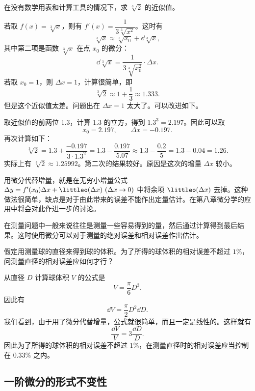 \begin{xexample}[6.3.1]
在没有数学用表和计算工具的情况下，求 $\sqrt[3]{2}$ 的近似值。
\end{xexample}
\begin{xsolution}
若取 $f(x)=\sqrt[3]{x}$，则有 $f'(x)=\dfrac1{3\sqrt[3]{x^2}}$。这时有
\[
  \sqrt[3]{x}\approx\sqrt[3]{x_0}+\dd\sqrt[3]{x},
\]
其中第二项是函数 $\sqrt[3]{x}$ 在点 $x_0$ 的微分：
\[
  \dd\sqrt[3]{x}=\frac1{3\sqrt[3]{x_0^2}}\cdot\Delta x.
\]
若取 $x_0=1$，则 $\Delta x=1$，计算很简单，即
\[
  \sqrt[3]{2}\approx1+\frac13\approx1.333.
\]
但是这个近似值太差。问题出在 $\Delta x=1$ 太大了。可以改进如下。

取近似值的前两位 1.3，计算 1.3 的立方，得到 $1.3^3=2.197$。因此可以取
\[
  x_0=2.197,\qquad\Delta x=-0.197.
\]
再次计算如下：
\[
  \sqrt[3]{2}
  =1.3+\frac{-0.197}{3\cdot1.3^2}
  =1.3-\frac{0.197}{5.07}
  \approx1.3-\frac{0.2}{5}
  =1.3-0.04=1.26.
\]
实际上有 $\sqrt[3]{2}\approx1.25992$。第二次的结果较好。原因是这次的增量 $\Delta x$ 较小。
\end{xsolution}

\begin{xremark}
用微分代替增量，就是在无穷小增量公式 $\Delta y=f'(x_0)\Delta x+\littleo(\Delta x)\ (\Delta x\to0)$ 中将余项 $\littleo(\Delta x)$ 去掉。这种做法很简单，缺点是对于由此带来的误差不能作出定量估计。在第八章微分学的应用中将会对此作进一步的讨论。

在测量问题中一般来说往往是测量一些容易得到的量，然后通过计算得到最后结果。这时使用微分可以对于测量的绝对误差和相对误差作出估计。
\end{xremark}

\begin{xexample}[6.3.2]
假定用测量球的直径来得到球的体积。为了所得的球体积的相对误差不超过 $1\%$，问测量直径的相对误差应如何才行？
\end{xexample}
\begin{xsolution}
从直径 $D$ 计算球体积 $V$ 的公式是
\[
  V=\frac\pi6D^3.
\]
因此有
\[
  \dd V=\frac\pi2D^2\dd D.
\]
我们看到，由于用了微分代替增量，公式就很简单，而且一定是线性的。这样就有
\[
  \frac{\dd V}{V}=3\frac{\dd D}{D}.
\]
因此为了所得的球体积的相对误差不超过 $1\%$，在测量直径时的相对误差应当控制在 $0.33\%$ 之内。
\end{xsolution}

\subsection{一阶微分的形式不变性}

